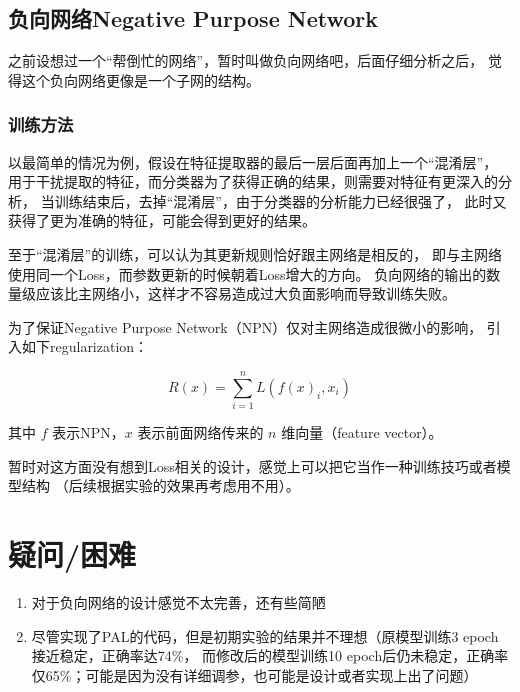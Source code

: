 \documentclass[UTF8]{ctexart}
\begin{document}
        \subsection{负向网络Negative Purpose Network}
            之前设想过一个“帮倒忙的网络”，暂时叫做负向网络吧，后面仔细分析之后，
            觉得这个负向网络更像是一个子网的结构。
            \subsubsection{训练方法}
                以最简单的情况为例，假设在特征提取器的最后一层后面再加上一个“混淆层”，
                用于干扰提取的特征，而分类器为了获得正确的结果，则需要对特征有更深入的分析，
                当训练结束后，去掉“混淆层”，由于分类器的分析能力已经很强了，
                此时又获得了更为准确的特征，可能会得到更好的结果。

                至于“混淆层”的训练，可以认为其更新规则恰好跟主网络是相反的，
                即与主网络使用同一个Loss，而参数更新的时候朝着Loss增大的方向。
                负向网络的输出的数量级应该比主网络小，这样才不容易造成过大负面影响而导致训练失败。

                为了保证Negative Purpose Network（NPN）仅对主网络造成很微小的影响，
                引入如下regularization：

                $$
                    R(x) = \sum_{i=1}^n L(f(x)_i, x_i)
                $$

                其中 $f$ 表示NPN，$x$ 表示前面网络传来的 $n$ 维向量（feature vector）。

                暂时对这方面没有想到Loss相关的设计，感觉上可以把它当作一种训练技巧或者模型结构
                （后续根据实验的效果再考虑用不用）。
    \section{疑问/困难}
        \begin{enumerate}
            \item 对于负向网络的设计感觉不太完善，还有些简陋
            \item 尽管实现了PAL的代码，但是初期实验的结果并不理想（原模型训练3 epoch接近稳定，正确率达74\%，
            而修改后的模型训练10 epoch后仍未稳定，正确率仅65\%；可能是因为没有详细调参，也可能是设计或者实现上出了问题）
        \end{enumerate}
\end{document}

